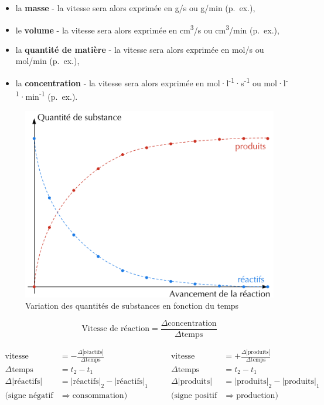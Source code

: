 \documentclass[
  11pt,
  french,
  a4paper,
  openany]{book}
\providecommand{\tightlist}{%
  \setlength{\itemsep}{0pt}\setlength{\parskip}{0pt}}
\begin{document}
\begin{itemize}
\tightlist
\item
  la \textbf{masse} - la vitesse sera alors exprimée en g/s ou g/min (p.~ex.),
\item
  le \textbf{volume} - la vitesse sera alors exprimée en cm\textsuperscript{3}/s ou cm\textsuperscript{3}/min (p.~ex.),
\item
  la \textbf{quantité de matière} - la vitesse sera alors exprimée en mol/s ou mol/min (p.~ex.),
\item
  la \textbf{concentration} - la vitesse sera alors exprimée en mol·l\textsuperscript{-1}·s\textsuperscript{-1} ou mol·l\textsuperscript{-1}·min\textsuperscript{-1} (p.~ex.).
\end{itemize}

\begin{figure}

{\centering \includegraphics[width=0.45\linewidth]{images/vitesse-reaction-1-a} 

}

\caption{Variation des quantités de substances en fonction du temps}\label{fig:vitesse-reaction-1-a}
\end{figure}

\[
\text{Vitesse de réaction} = \frac{\Delta \text{concentration}}{\Delta \text{temps}}
\]

\[
\begin{split}
\text{vitesse} &= - \frac{\Delta |\text{réactifs}|}{\Delta \text{temps}} \\[1em]
\Delta \text{temps} &= t_2 - t_1 \\
\Delta |\text{réactifs}| &= |\text{réactifs}|_2 - |\text{réactifs}|_1 \\[1em]
(\text{signe négatif} &\Rightarrow \text{consommation})
\end{split}
\qquad
\begin{split}
\text{vitesse} &= + \frac{\Delta |\text{produits}|}{\Delta \text{temps}} \\[1em]
\Delta \text{temps} &= t_2 - t_1 \\
\Delta |\text{produits}| &= |\text{produits}|_2 - |\text{produits}|_1 \\[1em]
(\text{signe positif} &\Rightarrow \text{production})
\end{split}
\]
\end{document}
